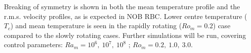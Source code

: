\begin{outline}
\1 Breaking of symmetry is shown in both the mean temperature profile and the r.m.s. velocity profiles, as is expected in NOB RBC.
\1 Lower centre temperature ($T_c$) and mean temperature is seen in the rapidly rotating ($Ro_m = 0.2$) case compared to the slowly rotating cases.
\1 Further simulations will be run, covering control parameters: $Ra_m = 10^6, \: 10^7, \: 10^8$ ; $Ro_m = 0.2, \: 1.0, \: 3.0$.

\end{outline}
